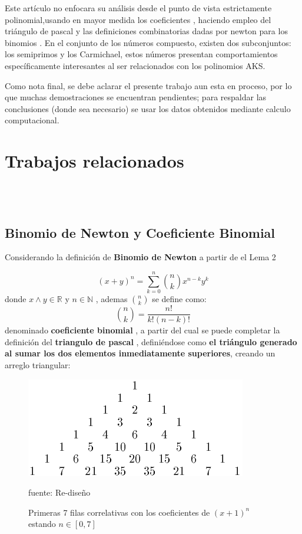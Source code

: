 \documentclass[a4paper, 12pt]{article}
\begin{document}
Este artículo no enfocara su análisis desde el punto de vista estrictamente polinomial,usando en mayor medida los coeficientes \citep{biPas}, haciendo empleo del triángulo de pascal y las definiciones combinatorias dadas por newton para los binomios \citep{binew}.
En el conjunto de los números compuesto, existen dos subconjuntos: los semiprimos y los Carmichael, estos números presentan comportamientos específicamente interesantes al ser relacionados con los polinomios AKS.

Como nota final, se debe aclarar el presente trabajo aun esta en proceso, por lo que muchas demostraciones se encuentran pendientes; para respaldar las conclusiones (donde sea necesario) se usar los datos obtenidos mediante calculo computacional.
\pagebreak
\section{Trabajos relacionados}\ \\
\
\subsection{Binomio de Newton y Coeficiente Binomial}
Considerando la definición de \textbf{Binomio de Newton} a partir de el Lema 2 \citep*[pag 11]{binew}

\[ (x + y)^{n} = \sum_{k=0}^{n}\binom{n}{k} x^{n-k} y^{k} \]
donde $x \land y \in \mathbb{R}$ y $n \in \mathbb{N}$ , ademas $\binom{n}{k}$ se define como:\\
\begin{equation}\label{binomio}
 \binom{n}{k} = \frac{n!}{k!(n-k)!} 
\end{equation}
denominado \textbf{coeficiente binomial} , a partir del cual se puede completar la definición del \textbf{triangulo de pascal} \citep[pag 4]{biPas} , definiéndose como \textbf{el triángulo generado al sumar los dos elementos inmediatamente superiores}, creando un arreglo triangular:
\begin{figure}[h]
	\centering
	\includegraphics[width=0.3\linewidth, height=0.1\textheight]{Pascal_triangle_small}
	\caption[Triangulo de Pascal]{Primeras 7 filas correlativas con los coeficientes de $(x+1)^{n}$ estando $n \in [0,7]$ }
	\small{fuente: Re-diseño \citep[pag. 11]{littleFermatBook}}
	\label{fig:pascaltrianglesmall}
\end{figure} 
\end{document}
